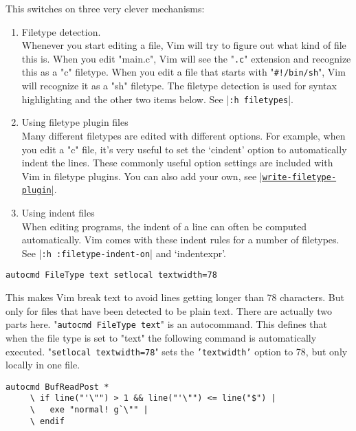 This switches on three very clever mechanisms:
\begin{enumerate}
				\item Filetype detection.\\
								Whenever you start editing a file, Vim will try to figure out what kind of file this is.
								When you edit "main.c", Vim will see the "\texttt{.c}" extension and recognize this as a "c" filetype.
								When you edit a file that starts with "\texttt{\#!/bin/sh}", Vim will recognize it as a "sh" filetype.
								The filetype detection is used for syntax highlighting and the other two items below.
								See |\texttt{:h filetypes}|.

				\item Using filetype plugin files\\
								Many different filetypes are edited with different options.
								For example, when you edit a "c" file, it's very useful to set the `cindent' option to automatically indent the lines.
								These commonly useful option settings are included with Vim in filetype plugins.
								You can also add your own, see \hyperref[write-filetype-plugin]{|\texttt{write-filetype-plugin}|}.

				\item Using indent files\\
								When editing programs, the indent of a line can often be computed automatically.
								Vim comes with these indent rules for a number of filetypes.
								See |\texttt{:h :filetype-indent-on}| and `indentexpr'.
\end{enumerate}

 \begin{Verbatim}[samepage=true]
 autocmd FileType text setlocal textwidth=78
 \end{Verbatim}

This makes Vim break text to avoid lines getting longer than 78 characters.
But only for files that have been detected to be plain text.
There are actually two parts here.
"\texttt{autocmd FileType text}" is an autocommand.
This defines that when the file type is set to "text" the following command is automatically executed.
"\texttt{setlocal textwidth=78}" sets the \texttt{'textwidth'} option to 78, but only locally in one file.

\label{restore-cursor}

\begin{Verbatim}[samepage=true]
 autocmd BufReadPost *
     \ if line("'\"") > 1 && line("'\"") <= line("$") |
     \   exe "normal! g`\"" |
     \ endif
\end{Verbatim}

